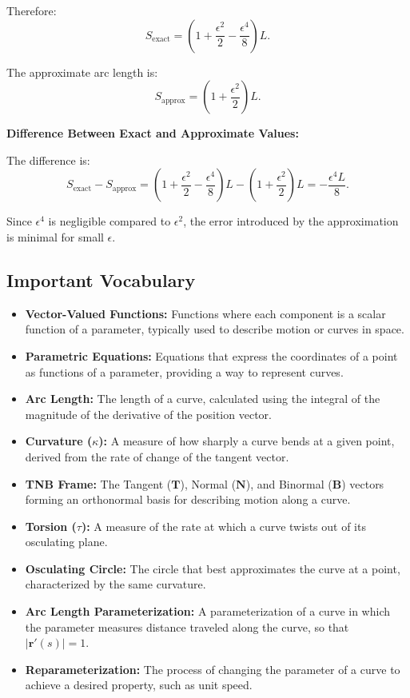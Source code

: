 \begin{example}
\begin{solution}
\begin{enumerate}
    Therefore:
    \[
    S_{\text{exact}} = \left( 1 + \dfrac{\epsilon^2}{2} - \dfrac{\epsilon^4}{8} \right) L.
    \]
    
    The approximate arc length is:
    \[
    S_{\text{approx}} = \left( 1 + \dfrac{\epsilon^2}{2} \right) L.
    \]
    
    \textbf{Difference Between Exact and Approximate Values:}
    
    The difference is:
    \[
    S_{\text{exact}} - S_{\text{approx}} = \left( 1 + \dfrac{\epsilon^2}{2} - \dfrac{\epsilon^4}{8} \right) L - \left( 1 + \dfrac{\epsilon^2}{2} \right) L = -\dfrac{\epsilon^4 L}{8}.
    \]
    
    Since \( \epsilon^4 \) is negligible compared to \( \epsilon^2 \), the error introduced by the approximation is minimal for small \( \epsilon \).
\end{enumerate}
\end{solution}
\end{example}
\exampleline


\newpage

\formsdefs{}

\subsection*{Important Vocabulary}
\begin{itemize}
    \item \textbf{Vector-Valued Functions:} Functions where each component is a scalar function of a parameter, typically used to describe motion or curves in space.
    \item \textbf{Parametric Equations:} Equations that express the coordinates of a point as functions of a parameter, providing a way to represent curves.
    \item \textbf{Arc Length:} The length of a curve, calculated using the integral of the magnitude of the derivative of the position vector.
    \item \textbf{Curvature (\(\kappa\)):} A measure of how sharply a curve bends at a given point, derived from the rate of change of the tangent vector.
    \item \textbf{TNB Frame:} The Tangent (\(\mathbf{T}\)), Normal (\(\mathbf{N}\)), and Binormal (\(\mathbf{B}\)) vectors forming an orthonormal basis for describing motion along a curve.
    \item \textbf{Torsion (\(\tau\)):} A measure of the rate at which a curve twists out of its osculating plane.
    \item \textbf{Osculating Circle:} The circle that best approximates the curve at a point, characterized by the same curvature.
    \item \textbf{Arc Length Parameterization:} A parameterization of a curve in which the parameter measures distance traveled along the curve, so that \( |\mathbf{r}'(s)| = 1 \).
    \item \textbf{Reparameterization:} The process of changing the parameter of a curve to achieve a desired property, such as unit speed.
\end{itemize}

